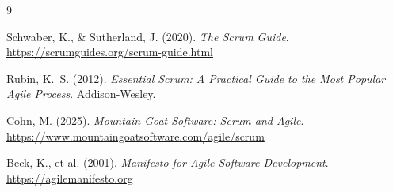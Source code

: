 \documentclass[11pt,a4paper]{article}
\begin{document}
\begin{thebibliography}{9}

Schwaber, K., \& Sutherland, J. (2020). \textit{The Scrum Guide}.
\url{https://scrumguides.org/scrum-guide.html}

Rubin, K.~S. (2012). \textit{Essential Scrum: A Practical Guide to the
Most Popular Agile Process}. Addison-Wesley.

Cohn, M. (2025). \textit{Mountain Goat Software: Scrum and Agile}.
\url{https://www.mountaingoatsoftware.com/agile/scrum}

Beck, K., et al. (2001). \textit{Manifesto for Agile Software Development}.
\url{https://agilemanifesto.org}

\end{thebibliography}
\end{document}
